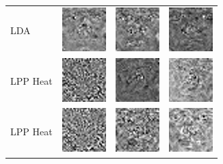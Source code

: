 \documentclass[10pt, a4paper]{article}
\begin{document}
\begin{figure}[h!]
\begin{tabular}{lccc}
LDA & \includegraphics{yale/yale_lda1} & \includegraphics{yale/yale_lda2} & \includegraphics{yale/yale_lda3} \\
LPP Heat & \includegraphics{yale/yale_lpp_heat1} & \includegraphics{yale/yale_lpp_heat2} & \includegraphics{yale/yale_lpp_heat3} \\
LPP Heat & \includegraphics{yale/yale_lpp_knn1} & \includegraphics{yale/yale_lpp_knn2} & \includegraphics{yale/yale_lpp_knn3} \\

\end{tabular}
\end{figure}
\end{document}
